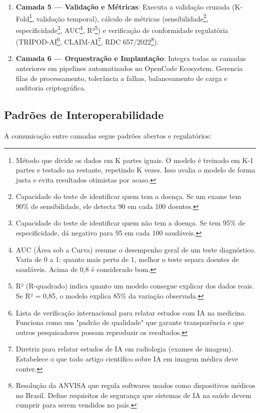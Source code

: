 \begin{enumerate}
    \item \textbf{Camada 5 --- Validação e Métricas}: Executa a validação cruzada (K-Fold\footnote{Método que divide os dados em K partes iguais. O modelo é treinado em K-1 partes e testado na restante, repetindo K vezes. Isso avalia o modelo de forma justa e evita resultados otimistas por acaso.}, validação temporal), cálculo de métricas (sensibilidade\footnote{Capacidade do teste de identificar quem tem a doença. Se um exame tem 90\% de sensibilidade, ele detecta 90 em cada 100 doentes.}, especificidade\footnote{Capacidade do teste de identificar quem não tem a doença. Se tem 95\% de especificidade, dá negativo para 95 em cada 100 saudáveis.}, AUC\footnote{AUC (Área sob a Curva) resume o desempenho geral de um teste diagnóstico. Varia de 0 a 1: quanto mais perto de 1, melhor o teste separa doentes de saudáveis. Acima de 0,8 é considerado bom.}, R²\footnote{R² (R-quadrado) indica quanto um modelo consegue explicar dos dados reais. Se R² = 0,85, o modelo explica 85\% da variação observada.}) e verificação de conformidade regulatória (TRIPOD-AI\footnote{Lista de verificação internacional para relatar estudos com IA na medicina. Funciona como um "padrão de qualidade" que garante transparência e que outros pesquisadores possam reproduzir os resultados.}, CLAIM-AI\footnote{Diretriz para relatar estudos de IA em radiologia (exames de imagem). Estabelece o que todo artigo científico sobre IA em imagem médica deve conter.}, RDC 657/2022\footnote{Resolução da ANVISA que regula softwares usados como dispositivos médicos no Brasil. Define requisitos de segurança que sistemas de IA na saúde devem cumprir para serem vendidos no país.}).
    
    \item \textbf{Camada 6 --- Orquestração e Implantação}: Integra todas as camadas anteriores em pipelines automatizados no OpenCode Ecosystem. Gerencia filas de processamento, tolerância a falhas, balanceamento de carga e auditoria criptográfica.
\end{enumerate}

\subsection{Padrões de Interoperabilidade}

A comunicação entre camadas segue padrões abertos e regulatórios:


